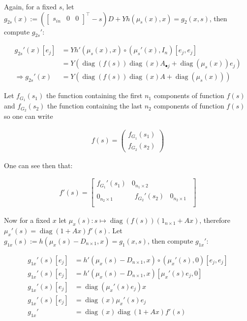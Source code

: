 \documentclass[processes,article,submit,moreauthors,pdftex]{Definitions/mdpi}
\DeclareMathOperator{\diag}{diag}
\begin{document}
Again, for a fixed $s$, let $g_{2s}(x):= \left(\begin{bmatrix} s_{in}&0&0 \end{bmatrix}^\top-s\right)D + Yh(\mu_s(x),x)=g_2(x,s)$, then compute $g_{2s}'$:

\begin{align} 
g_{2s}'(x)[e_j]&=Yh'(\mu_s(x),x) \circ (\mu_s'(x),I_n)[e_j, e_j]\\
&=Y\left(\diag(f(s))\diag(x)A_{\bullet j} +  \diag(\mu_s(x))e_j \right) \\
\Rightarrow g_{2s}'(x) &= Y(\diag(f(s))\diag(x)A +  \diag(\mu_s(x)))
\end{align}


Let $f_{G_1}(s_1)$ the function containing the first $n_1$ components of function $f(s)$ and $f_{G_2}(s_2)$ the function containing the last $n_2$ components of function $f(s)$ so one can write 

\begin{align}
f(s) = \begin{pmatrix}
f_{G_1}(s_1) \\
f_{G_2}(s_2)
\end{pmatrix}
\end{align}

One can see then that:

\begin{align}
f'(s)= \begin{bmatrix}
f_{G_1}'(s_1) & 0_{n_1\times 2} \\
0_{n_2\times 1} & \begin{matrix} f_{G_2}'(s_2) & 0_{n_2\times 1} \end{matrix}  \\ 
\end{bmatrix}
\end{align}

Now for a fixed $x$ let $\mu_x(s): s \mapsto   \diag(f(s))(1_{n\times 1}+Ax)$, therefore $\mu_x'(s) =\diag(1+Ax)f'(s)$. Let $g_{1x}(s):= h(\mu_x(s) - D_{n\times 1},x)=g_1(x,s)$, then compute $g_{1x}'$:

\begin{align} 
g_{1x}'(s)[e_j]&=h'(\mu_x(s) - D_{n\times 1},x) \circ (\mu_x'(s),0)[e_j, e_j]\\
g_{1x}'(s)[e_j]&=h'(\mu_x(s) - D_{n\times 1},x) [\mu_x'(s)e_j, 0]\\
g_{1x}'(s)[e_j]&=\diag(\mu_x'(s)e_j)x \\
g_{1x}'(s)[e_j]&=\diag(x)\mu_x'(s)e_j \\
g_{1x}' &= \diag(x)\diag(1+Ax)f'(s)
\end{align}
\end{document}
